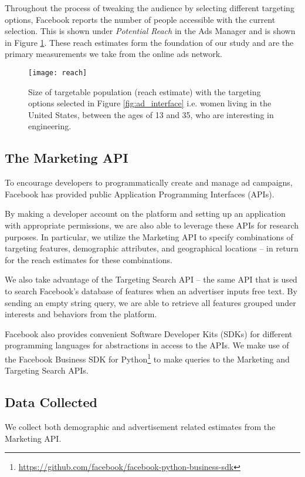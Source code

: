 Throughout the process of tweaking the audience by selecting different targeting options, Facebook reports the number of people accessible with the current selection. This is shown under \textit{Potential Reach} in the Ads Manager and is shown in Figure \ref{fig:reach}. These reach estimates form the foundation of our study and are the primary measurements we take from the online ads network.

\begin{figure}

\centering
\texttt{[image: reach]}
\caption{Size of targetable population (reach estimate) with the targeting options selected in Figure \ref{fig:ad_interface} i.e. women living in the United States, between the ages of 13 and 35, who are interesting in engineering.}
\label{fig:reach}

\end{figure}

\subsection{The Marketing API} \label{subsec:marketing_api}
To encourage developers to programmatically create and manage ad campaigns, Facebook has provided public Application Programming Interfaces (APIs).

By making a developer account on the platform and setting up an application with appropriate permissions, we are also able to leverage these APIs for research purposes. In particular, we utilize the Marketing API to specify combinations of targeting features, demographic attributes, and geographical locations -- in return for the reach estimates for these combinations.

We also take advantage of the Targeting Search API -- the same API that is used to search Facebook's database of features when an advertiser inputs free text. By sending an empty string query, we are able to retrieve all features grouped under interests and behaviors from the platform.

Facebook also provides convenient Software Developer Kits (SDKs) for different programming languages for abstractions in access to the APIs. We make use of the Facebook Business SDK for Python\footnote{\url{https://github.com/facebook/facebook-python-business-sdk}} to make queries to the Marketing and Targeting Search APIs.

\subsection{Data Collected} \label{subsec:data_collected}
We collect both demographic and advertisement related estimates from the Marketing API. 

